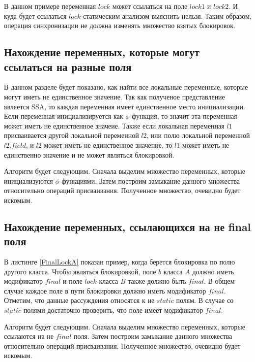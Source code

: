 

В данном примере переменная $lock$ может ссылаться на поле $lock1$ и $lock2$. И куда будет ссылаться $lock$ статическим анализом выяснить нельзя. Таким образом, операция  синхронизации не должна изменять множество взятых блокировок.

\subsection{Нахождение переменных, которые могут ссылаться на разные поля}
В данном разделе будет показано, как найти все локальные переменные, которые могут иметь не единственное значение.
Так как полученое представление является SSA, то каждая переменная имеет единственное место инициализации. 
Если переменная инициализируется как $\phi$-функция, то значит эта переменная может иметь не единственное значеие. Также если локальная переменная $l1$ присваивается другой локальной переменной $l2$, или полю локальной переменной $l2.field$, и $l2$ может иметь не единственное значение, то $l1$ может иметь не единственно значение и не может являться блокировкой.

Алгоритм будет следующим. Сначала выделим множество переменных, которые инициализуются $\phi$-функциями. Затем построим замыкание данного множества относительно операций присваивания. Полученное множество, очевидно будет искомым.

\subsection{Нахождение переменных, ссылающихся на не final поля}


В листинге \ref{FinalLockA} показан пример, когда берется блокировка по полю другого класса. 
Чтобы являться блокировкой, поле $b$ класса $A$ должно иметь модификатор $final$ и поле $lock$ класса $B$ также должно быть $final$. В общем случае каждое поле в пути блокировки должно иметь модификатор $final$. Отметим, что данные рассуждения относятся к не $static$ полям. В случае со $static$ полями достаточно проверить, что поле имеет модификатор $final$.

Алгоритм будет следующим. Сначала выделим множество переменных, которые ссылаются на не $final$ поля. Затем построим замыкание данного множества относительно операций присваивания. Полученное множество, очевидно будет искомым.

